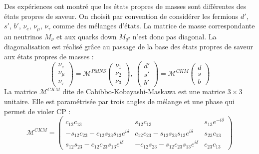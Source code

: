 Des expériences ont montré que les états propres de masses sont différentes des états propres de saveur. On choisit par convention de considérer les fermions $d'$, $s'$, $b'$, $\nu_{e}$, $\nu_{\mu}$, $\nu_{\tau}$ comme des mélanges d'états. La matrice de masse correspondante au neutrinos $M_{\nu}$ et aux quarks down $M_{q^d}$ n'est donc pas diagonal. La diagonalisation est réalisé grâce au passage de la base des états propres de saveur aux états propres de masses :
\begin{equation}
\begin{pmatrix} 
\nu_{e} \\ 
\nu_{\mu} \\ 
\nu_{\tau} 
\end{pmatrix}=\mathcal{M}^{PMNS}
\begin{pmatrix} 
\nu_{1}\\ 
\nu_{2}\\ 
\nu_{3}
\end{pmatrix},\ \begin{pmatrix} 
d' \\ 
s' \\ 
b' 
\end{pmatrix}=\mathcal{M}^{CKM}
\begin{pmatrix} 
d \\ 
s\\ 
b
\end{pmatrix}
\end{equation} 
La matrice $\mathcal{M}^{CKM}$ dite de Cabibbo-Kobayashi-Maskawa est une matrice $3\times3$ unitaire. Elle est paramétrisée par trois angles de mélange et une phase qui permet de violer CP :
\begin{equation}
\mathcal{M}^{CKM}= 
\begin{pmatrix} 
c_{12}c_{13} & s_{12}c_{13} & s_{13}e^{-i\delta} \\
-s_{12}c_{23}-c_{12}s_{23}s_{13}e^{i\delta} & c_{12}c_{23}-s_{12}s_{23}s_{13}e^{i\delta} & s_{23}c_{13} \\
s_{12}s_{23}-c_{12}c_{23}s_{13}e^{i\delta} & -c_{12}s_{23}-s_{12}c_{23}s_{13}e^{i\delta} & c_{23}c_{13}
\end{pmatrix}
\end{equation} 
 
